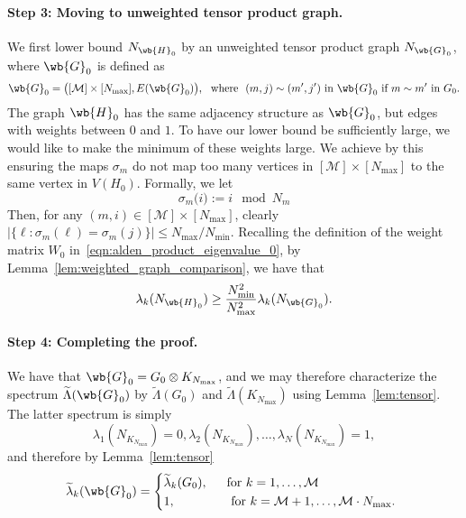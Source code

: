 \documentclass{article}
\newcommand{\abs}[1]{\left \lvert #1 \right \rvert}
\newcommand{\1}{\mathbf{1}}
\newcommand{\wt}[1]{\widetilde{#1}}
\newcommand{\mc}[1]{\mathcal{#1}}
\theoremstyle{alden}
\theoremstyle{aldenthm}
\theoremstyle{definition}
\theoremstyle{remark}
\begin{document}
\paragraph{Step 3: Moving to unweighted tensor product graph.}
We first lower bound $N_{\wb{H}_0}$ by an unweighted tensor product graph $N_{\wb{G}_0}$, where $\wb{G}_0$ is defined as
\begin{equation*}
\wb{G}_0 = \bigl([\mc{M}] \times [N_{\max}], E(\wb{G}_0)\bigr),~~\textrm{where}~~ (m,j) \sim (m',j')~ \textrm{in $\wb{G}_0$ if}~ m \sim m'~\textrm{in $G_0$.} 
\end{equation*}
The graph $\wb{H}_0$ has the same adjacency structure as $\wb{G}_0$, but edges with weights between $0$ and $1$. To have our lower bound be sufficiently large, we would like to make the minimum of these weights large. We achieve by this ensuring the maps $\sigma_m$ do not map too many vertices in $[\mc{M}] \times [N_{\max}]$ to the same vertex in $V(H_0)$. Formally, we let
\begin{equation*}
\sigma_m\bigl(i\bigr) := i \mod N_{m}
\end{equation*}
Then, for any $(m,i) \in [\mc{M}] \times [N_{\max}]$, clearly $\abs{\{\ell:\sigma_m(\ell) = \sigma_m(j)\}} \leq N_{\max} / N_{\min}$. Recalling the definition of the weight matrix $W_0$ in~\eqref{eqn:alden_product_eigenvalue_0}, by Lemma~\ref{lem:weighted_graph_comparison}, we have that
\begin{equation*}
\lambda_k(N_{\wb{H}_0}) \geq \frac{N_{\min}^2}{N_{\max}^2} \lambda_k(N_{\wb{G}_0}).
\end{equation*}

\paragraph{Step 4: Completing the proof.}
We have that $\wb{G}_0 = G_0 \otimes K_{N_{\max}}$, and we may therefore characterize the spectrum $\wt{\Lambda}(\wb{G}_0)$ by $\wt{\Lambda}(G_0)$ and $\wt{\Lambda}(K_{N_{\max}})$ using Lemma~\ref{lem:tensor}. The latter spectrum is simply
\begin{equation*}
\lambda_1(N_{K_{N_{\max}}}) = 0, \lambda_2(N_{K_{N_{\max}}}),\ldots,\lambda_N(N_{K_{N_{\max}}}) = 1,
\end{equation*}
and therefore by Lemma~\ref{lem:tensor}
\begin{equation}
\wt{\lambda}_k(\wb{G}_0) =
\begin{cases*}
\wt{\lambda}_k(G_0),& ~~\textrm{for $k = 1,\ldots,\mc{M}$} \\
1,& ~~ \textrm{for $k = \mc{M} + 1,\ldots, \mc{M} \cdot N_{\max}$.}
\end{cases*}
\end{equation}
\end{document}
